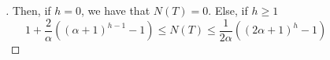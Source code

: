 \documentclass{beamer}
\begin{document}
\begin{frame}
\begin{columns}
\begin{column}{\textlecolumn}
            \begin{block}{}
                \begin{proof}[\unskip\nopunct]
                    Then, if \(h = 0\), we have that \(N\left(T\right) = 0\). Else, if \(h \geq 1\)
                    \[
                        1 + \frac{2}{\alpha}\left(\left(\alpha + 1\right)^{h - 1} - 1\right) 
                        \leq 
                        N\left(T\right) 
                        \leq 
                        \frac{1}{2\alpha}\left(\left(2\alpha + 1\right)^{h} - 1\right)
                        \tag{Nodes Bounds}\label{btree-nodes-num}
                    \]
                \end{proof}
            \end{block}
        \end{column}
        \begin{column}{\textricolumn}
        \end{column}
    \end{columns}
\end{frame}
\end{document}
